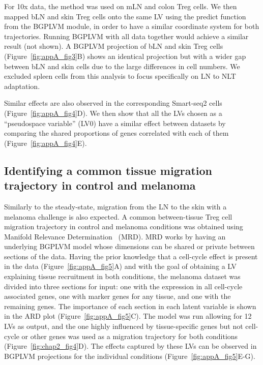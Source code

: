 For 10x data, the method was used on mLN and colon Treg cells. We then mapped bLN and skin Treg cells onto the same LV using the predict function from the BGPLVM module, in order to have a similar coordinate system for both trajectories. Running BGPLVM with all data together would achieve a similar result (not shown). A BGPLVM projection of bLN and skin Treg cells (Figure~\ref{fig:appA_fig3}B) shows an identical projection but with a wider gap between bLN and skin cells due to the large differences in cell numbers. We excluded spleen cells from this analysis to focus specifically on LN to NLT adaptation.

Similar effects are also observed in the corresponding Smart-seq2 cells (Figure~\ref{fig:appA_fig4}D). We then show that all the LVs chosen as a “pseudospace variable” (LV0) have a similar effect between datasets by comparing the shared proportions of genes correlated with each of them (Figure~\ref{fig:appA_fig4}E).


\subsection{Identifying a common tissue migration trajectory in control and melanoma}
Similarly to the steady-state, migration from the LN to the skin with a melanoma challenge is also expected. A common between-tissue Treg cell migration trajectory in control and melanoma conditions was obtained using Manifold Relevance Determination~\citep{Andreas_Damianou_Carl_Ek_Michalis_Titsias_Neil_Lawrence2012-do} (MRD). MRD works by having an underlying BGPLVM model whose dimensions can be shared or private between sections of the data. Having the prior knowledge that a cell-cycle effect is present in the data (Figure~\ref{fig:appA_fig5}A) and with the goal of obtaining a LV explaining tissue recruitment in both conditions, the melanoma dataset was divided into three sections for input: one with the expression in all cell-cycle associated genes, one with marker genes for any tissue, and one with the remaining genes. The importance of each section in each latent variable is shown in the ARD plot (Figure~\ref{fig:appA_fig5}C). The model was run allowing for 12 LVs as output, and the one highly influenced by tissue-specific genes but not cell-cycle or other genes was used as a migration trajectory for both conditions (Figure~\ref{fig:chap2_fig4}D). The effects captured by these LVs can be observed in BGPLVM projections for the individual conditions (Figure~\ref{fig:appA_fig5}E-G).

